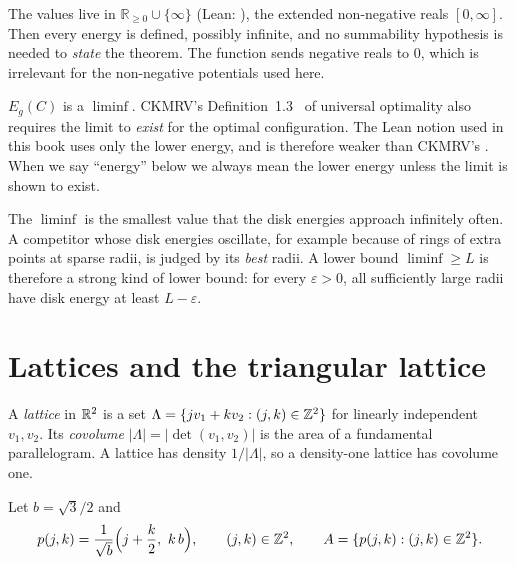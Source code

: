 The values live in $\mathbb R_{\ge0}\cup\{\infty\}$ (Lean: ), the extended non-negative reals $[0,\infty]$. Then every energy is defined, possibly
infinite, and no summability hypothesis is needed to \emph{state} the theorem. The function  sends
negative reals to $0$, which is irrelevant for the non-negative potentials used here.

\begin{warnbox}
$E_g(C)$ is a $\liminf$. CKMRV's Definition~1.3~\cite{ckmrv} of universal optimality also requires the limit to
\emph{exist} for the optimal configuration. The Lean notion used in this book uses only the lower energy, and is
therefore weaker than CKMRV's \tierC{}. When we say ``energy'' below we always mean the lower energy unless the limit is
shown to exist.
\end{warnbox}

\begin{example}\label{ex:liminf}
The $\liminf$ is the smallest value that the disk energies approach infinitely often. A competitor whose disk energies
oscillate, for example because of rings of extra points at sparse radii, is judged by its \emph{best} radii. A lower
bound $\liminf\ge L$ is therefore a strong kind of lower bound: for every $\varepsilon>0$, all sufficiently large radii
have disk energy at least $L-\varepsilon$. \tierC{}
\end{example}

\section{Lattices and the triangular lattice}
\label{sec:lattices}

A \emph{lattice} in $\mathbb{R}^2$ is a set $\Lambda=\{jv_1+kv_2:(j,k)\in\mathbb{Z}^2\}$ for linearly independent $v_1,v_2$. Its
\emph{covolume} $|\Lambda|=|\det(v_1,v_2)|$ is the area of a fundamental parallelogram. A lattice has density
$1/|\Lambda|$, so a density-one lattice has covolume one.

\begin{definition}\label{def:A}
Let $b=\sqrt3/2$ and
\[
  p(j,k)=\frac{1}{\sqrt b}\Bigl(j+\frac k2,\ k\,b\Bigr),\qquad (j,k)\in\mathbb{Z}^2,
  \qquad A=\{p(j,k):(j,k)\in\mathbb{Z}^2\}.
\]
\end{definition}


